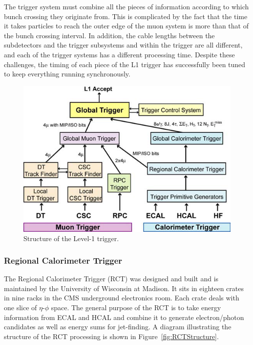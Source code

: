 The trigger system must combine all the pieces of information 
according to which bunch crossing they originate from.   
This is complicated by the fact that the time it takes particles 
to reach the outer edge of the muon system 
is 
more than %
that of the bunch crossing interval.  
In addition, the cable lengths between the subdetectors 
and the trigger subsystems and within the trigger are 
all different, 
and each of the trigger systems has a different processing time.  
Despite these challenges, the timing of each piece of 
the L1 trigger has successfully been tuned to keep everything running 
synchronously.  



 \begin{figure}[htb]
  \begin{center}
    \includegraphics[width=360pt]{Figures/L1structure.png}
  \end{center}
  \caption[\fixspacing Structure of the Level-1 trigger]
	  {\fixspacing Structure of the Level-1 trigger.}
  \label{fig:L1Structure}
 \end{figure}

\subsubsection{Regional Calorimeter Trigger}
\label{exp:RCT}
The Regional Calorimeter Trigger (RCT) \cite{rctTriggerSystem}
was designed and built and is maintained 
by the University of Wisconsin at Madison.  
It sits in eighteen crates in nine racks in the CMS underground electronics room.  
Each crate deals with one slice of $\eta$-$\phi$ space.  
The general purpose of the RCT is to take 
energy information from ECAL and HCAL and combine it 
to generate electron/photon candidates as well as energy sums for 
jet-finding.  
A diagram illustrating the structure of the RCT processing 
is shown in Figure~\ref{fig:RCTStructure}.  

